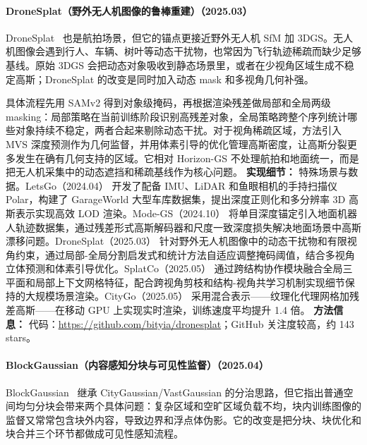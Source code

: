 \paragraph{DroneSplat（野外无人机图像的鲁棒重建）（2025.03）}
DroneSplat~\cite{2503_16964} 也是航拍场景，但它的锚点更接近野外无人机 SfM 加 3DGS。无人机图像会遇到行人、车辆、树叶等动态干扰物，也常因为飞行轨迹稀疏而缺少足够基线。原始 3DGS 会把动态对象吸收到静态场景里，或者在少视角区域生成不稳定高斯；DroneSplat 的改变是同时加入动态 mask 和多视角几何补强。

具体流程先用 SAMv2 得到对象级掩码，再根据渲染残差做局部和全局两级 masking：局部策略在当前训练阶段识别高残差对象，全局策略跨整个序列统计哪些对象持续不稳定，两者合起来剔除动态干扰。对于视角稀疏区域，方法引入 MVS 深度预测作为几何监督，并用体素引导的优化管理高斯密度，让高斯分裂更多发生在确有几何支持的区域。它相对 Horizon-GS 不处理航拍和地面统一，而是把无人机采集中的动态遮挡和稀疏基线作为核心问题。
\textbf{实现细节：} 特殊场景与数据。LetsGo（2024.04） 开发了配备 IMU、LiDAR 和鱼眼相机的手持扫描仪 Polar，构建了 GarageWorld 大型车库数据集，提出深度正则化和多分辨率 3D 高斯表示实现高效 LOD 渲染。Mode-GS（2024.10） 将单目深度锚定引入地面机器人轨迹数据集，通过残差形式高斯解码器和尺度一致深度损失解决地面场景中高斯漂移问题。DroneSplat（2025.03） 针对野外无人机图像中的动态干扰物和有限视角约束，通过局部-全局分割启发式和统计方法自适应调整掩码阈值，结合多视角立体预测和体素引导优化。SplatCo（2025.05） 通过跨结构协作模块融合全局三平面和局部上下文网格特征，配合跨视角剪枝和结构-视角共学习机制实现细节保持的大规模场景渲染。CityGo（2025.05） 采用混合表示——纹理化代理网格加残差高斯——在移动 GPU 上实现实时渲染，训练速度平均提升 1.4 倍。
\textbf{方法信息：} 代码：\url{https://github.com/bityia/dronesplat}；GitHub 关注度较高，约 143 stars。



\paragraph{BlockGaussian（内容感知分块与可见性监督）（2025.04）}
BlockGaussian~\cite{2504_09048} 继承 CityGaussian/VastGaussian 的分治思路，但它指出普通空间均匀分块会带来两个具体问题：复杂区域和空旷区域负载不均，块内训练图像的监督又常常包含块外内容，导致边界和浮点体伪影。它的改变是把分块、块优化和块合并三个环节都做成可见性感知流程。

